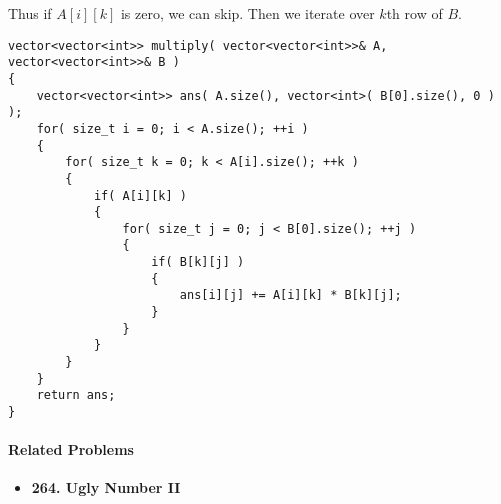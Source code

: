 Thus if $A[i][k]$ is zero, we can skip. Then we iterate over $k$th row of $B$. 

\setcounter{lstlisting}{0}
\begin{lstlisting}[style=customc, caption={Skip Zero}]
vector<vector<int>> multiply( vector<vector<int>>& A, vector<vector<int>>& B )
{
    vector<vector<int>> ans( A.size(), vector<int>( B[0].size(), 0 ) );
    for( size_t i = 0; i < A.size(); ++i )
    {
        for( size_t k = 0; k < A[i].size(); ++k )
        {
            if( A[i][k] )
            {
                for( size_t j = 0; j < B[0].size(); ++j )
                {
                    if( B[k][j] )
                    {
                        ans[i][j] += A[i][k] * B[k][j];
                    }
                }
            }
        }
    }
    return ans;
}
\end{lstlisting}

\paragraph{Related Problems}
\begin{itemize}
\item \textbf{264. Ugly Number II}
\end{itemize}